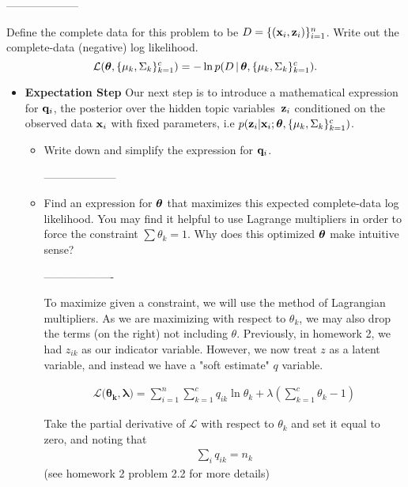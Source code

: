 \documentclass[a4paper, 12pt]{article}
\begin{document}
--------------------

        Define the complete data for this problem to be $D = \{(\mathbf{x}_i, \mathbf{z}_i)\}_{i=1}^n$.
        Write out the complete-data (negative) log likelihood.  \[\mathcal{L}(\boldsymbol{\theta},
        \{\mu_k,\Sigma_k\}^c_{k=1}) =  -\ln p(D \,|\,\boldsymbol{\theta}, \{\mu_k,\Sigma_k\}^c_{k=1}).\] 

        \begin{itemize}
   \item \textbf{Expectation Step}
        Our next step is to introduce a mathematical expression for $\mathbf{q}_i$, the posterior over
        the hidden topic variables~$\mathbf{z}_i$ conditioned on the observed data $\mathbf{x}_i$ with fixed
        parameters, i.e $p(\mathbf{z}_i | \mathbf{x}_i; \boldsymbol{\theta}, \{ \mu_k,\Sigma_k \}^c_{k=1})$.

        \begin{itemize}
            \item  Write down and simplify the expression for $\mathbf{q}_i$. 

--------------------

			\item Find an expression for $\boldsymbol{\theta}$ that maximizes this expected complete-data log
				likelihood. You may find it helpful to use Lagrange multipliers in order to force
				the constraint $\sum \theta_k = 1$. Why does this optimized $\boldsymbol{\theta}$ make intuitive
				sense?

            -------------------

                To maximize given a constraint, we will use the method of Lagrangian multipliers. As
                we are maximizing with respect to $\theta_k$, we may also drop the terms (on the
                right) not including $\theta$. Previously, in homework 2, we had $z_{ik}$ as our
                indicator variable. However, we now treat $z$ as a latent variable, and instead we
                have a "soft estimate" $q$ variable.

                    \begin{align}
                        \mathcal{L(\mathbf{\theta_k, \lambda}}) = \sum_{i=1}^n \sum_{k=1}^c q_{ik}
                        \ln\theta_k + \lambda (\sum_{k=1}^c \theta_k - 1) \label{eq:lag}
                    \end{align}

                    Take the partial derivative of $\mathcal{L}$ with respect to $\theta_k$ and set
                    it equal to zero, and noting that 
                    \begin{align}
                        \sum_i q_{ik} = n_k \label{eq:sumq}
                    \end{align}
                     (see homework 2 problem 2.2 for more details)


\end{itemize}
\end{itemize}
\end{document}
